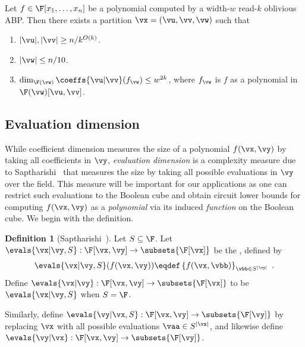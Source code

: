 \documentclass[11pt]{article}
\numberwithin{equation}{section}
\theoremstyle{definition}
\newtheorem{definition}[theorem]{Definition}
\theoremstyle{plain}
\begin{document}
\begin{theoremwp}\label{thm:read-k-eval-dim}
        Let $f \in \F[x_1, \ldots, x_n]$ be a polynomial computed by a width-$w$ read-$k$ oblivious ABP\@. Then there exists a partition $\vx=(\vu,\vv,\vw)$ such that
        \begin{enumerate}
                \item $|\vu|, |\vv| \ge n/k^{O(k)}$.
                \item $|\vw| \le n/10$.
                \item $\dim_{\F(\vw)} \coeffs{\vu|\vv}(f_\vw) \le w^{2k}$, where $f_\vw$ is $f$ as a polynomial in $\F(\vw)[\vu,\vv]$.
                        \qedhere
        \end{enumerate}
\end{theoremwp}


\subsection{Evaluation dimension}\label{sec:eval-dim}

While coefficient dimension measures the size of a polynomial $f(\vx,\vy)$ by taking all coefficients in $\vy$, \emph{evaluation dimension} is a complexity measure due to Saptharishi~\cite{Saptharishi12} that measures the size by taking all possible evaluations in $\vy$ over the field.  This measure will be important for our applications as one can restrict such evaluations to the Boolean cube and obtain circuit lower bounds for computing $f(\vx,\vy)$ as a \emph{polynomial} via its induced \emph{function} on the Boolean cube. We begin with the definition.

\begin{definition}[Saptharishi~\cite{Saptharishi12}]\label{defn:evaluation-space}
        Let $S\subseteq \F$. Let $\evals{\vx|\vy,S}:\F[\vx,\vy]\to\subsets{\F[\vx]}$ be the , defined by
        \[
                \evals{\vx|\vy,S}(f(\vx,\vy))
                \eqdef
                \left\{
                        f(\vx,\vbb)
                \right\}_{\vbb\in S^{|\vy|}}
                \;.
        \]
        Define $\evals{\vx|\vy}:\F[\vx,\vy]\to\subsets{\F[\vx]}$ to be $\evals{\vx|\vy,S}$ when $S=\F$.

        Similarly, define $\evals{\vy|\vx,S}:\F[\vx,\vy]\to\subsets{\F[\vy]}$ by replacing $\vx$ with all possible evaluations $\vaa\in S^{|\vx|}$, and likewise define $\evals{\vy|\vx}:\F[\vx,\vy]\to\subsets{\F[\vy]}$.
\end{definition}
\end{document}
